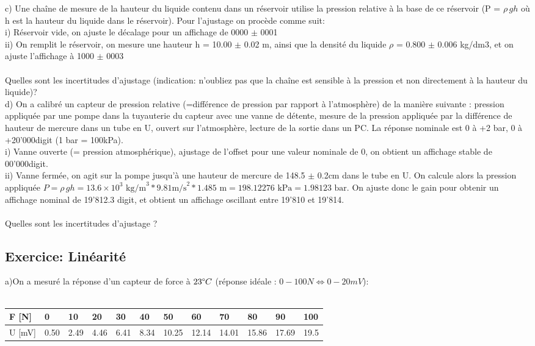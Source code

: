 \documentclass[main.tex]{subfiles}
\begin{document}
c)	Une chaîne de mesure de la hauteur du liquide contenu dans un réservoir utilise la pression relative à la base de ce réservoir (P = $\rho\,gh$ où h est la hauteur du liquide dans le réservoir). Pour l'ajustage on procède comme suit: \\
i)	Réservoir vide, on ajuste le décalage pour un affichage de 0000  $\pm$  0001 \\
ii)	On remplit le réservoir, on mesure une hauteur h = 10.00 $\pm$ 0.02 m, ainsi que la densité du liquide  $\rho$ = 0.800  $\pm$  0.006 kg/dm3, et on ajuste l'affichage à 1000  $\pm$  0003 \\ ~ \\
Quelles sont les incertitudes d'ajustage (indication: n'oubliez pas que la chaîne est sensible à la pression et non directement à la hauteur du liquide)? \\

d)	On a calibré un capteur de pression relative (=différence de pression par rapport à l'atmosphère) de la manière suivante : pression appliquée par une pompe dans la tuyauterie du capteur avec une vanne de détente, mesure de la pression appliquée par la différence de hauteur de mercure dans un tube en U, ouvert sur l'atmosphère, lecture de la sortie dans un PC. La réponse nominale est 0 à +2 bar, 0 à +20'000digit (1 bar = 100kPa). \\
i)	Vanne ouverte (= pression atmosphérique), ajustage de l'offset pour une valeur nominale de 0, on obtient un affichage stable de 00'000digit. \\
ii)	Vanne fermée, on agit sur la pompe jusqu'à une hauteur de mercure de 148.5 $\pm$ 0.2cm dans le tube en U. On calcule alors la pression appliquée $P=\rho\,gh = 13.6\times10^3 \text{ kg/m}^3 * 9.81\text {m/s}^2 * 1.485\text{ m}=198.12276\text{ kPa} = 1.98123\text{ bar}$. On ajuste donc le gain pour obtenir un affichage nominal de 19'812.3 digit, et obtient un affichage oscillant entre 19'810 et 19'814. \\ ~\\
Quelles sont les incertitudes d'ajustage ?

\subsection{Exercice: Linéarité}

a)On a mesuré la réponse d'un capteur de force à $23 \degree C$ (réponse idéale : $0-100N \Leftrightarrow 0-20 mV$):\\
~
\\
\begin{tabular}{|l|l|l|l|l|l|l|l|l|l|l|l|}
    \hline
    F [N]  & 0    & 10   & 20   & 30   & 40   & 50    & 60    & 70    & 80    & 90    & 100  \\
    \hline
    U [mV] & 0.50 & 2.49 & 4.46 & 6.41 & 8.34 & 10.25 & 12.14 & 14.01 & 15.86 & 17.69 & 19.5 \\
    \hline
\end{tabular}
\\
\end{document}
